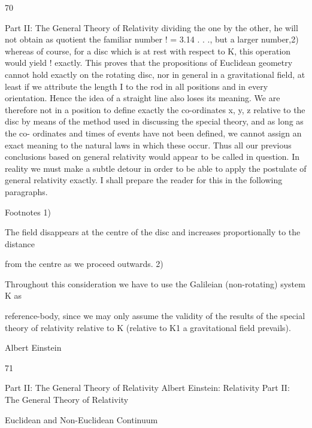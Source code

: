 \documentclass{article}
\begin{document}
70

Part II: The General Theory of Relativity
dividing the one by the other, he will not obtain as quotient the familiar number ! = 3.14 . .
., but a larger number,2) whereas of course, for a disc which is at rest with respect to K, this
operation would yield ! exactly. This proves that the propositions of Euclidean geometry
cannot hold exactly on the rotating disc, nor in general in a gravitational field, at least if we
attribute the length I to the rod in all positions and in every orientation. Hence the idea of a
straight line also loses its meaning. We are therefore not in a position to define exactly the
co-ordinates x, y, z relative to the disc by means of the method used in discussing the
special theory, and as long as the co- ordinates and times of events have not been defined,
we cannot assign an exact meaning to the natural laws in which these occur.
Thus all our previous conclusions based on general relativity would appear to be called in
question. In reality we must make a subtle detour in order to be able to apply the postulate
of general relativity exactly. I shall prepare the reader for this in the following paragraphs.

Footnotes
1)

The field disappears at the centre of the disc and increases proportionally to the distance

from the centre as we proceed outwards.
2)

Throughout this consideration we have to use the Galileian (non-rotating) system K as

reference-body, since we may only assume the validity of the results of the special theory of
relativity relative to K (relative to K1 a gravitational field prevails).

Albert Einstein

71

Part II: The General Theory of Relativity
Albert Einstein: Relativity
Part II: The General Theory of Relativity

Euclidean and Non-Euclidean
Continuum
\end{document}
